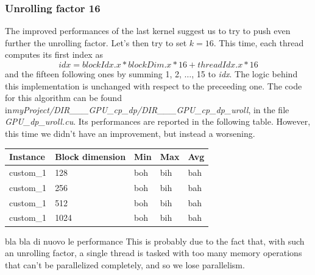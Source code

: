 \documentclass[12pt]{extarticle}
\begin{document}
\subsubsection{Unrolling factor 16}
The improved performances of the last kernel suggest us to try to push even further the unrolling factor. Let's then try to set $k=16$. This time, each thread computes its first index as
\[idx = blockIdx.x * blockDim.x * 16 + threadIdx.x * 16 \]
and the fifteen following ones by summing 1, 2, $\dots$, 15 to \emph{idx}. The logic behind this implementation is unchanged with respect to the preceeding one.\newline
The code for this algorithm can be found in\newline \emph{myProject/DIR\_\_\_GPU\_cp\_dp/DIR\_\_\_GPU\_cp\_dp\_uroll}, in the file \emph{GPU\_dp\_uroll.cu}.\newline
Its performances are reported in the following table. However, this time we didn't have an improvement, but instead a worsening.
\begin{center}
\begin{tabular}{ | m{2.2cm} | m{3.2cm} | m{2.2cm} | m{2.2cm} | m{2.2cm} |}
 \hline
 Instance & Block dimension & Min & Max & Avg\\
 \hline
 custom\_1 & 128 & boh & bih & bah\\
 \hline
 custom\_1 & 256 & boh & bih & bah\\
 \hline
 custom\_1 & 512 & boh & bih & bah\\
 \hline
 custom\_1 & 1024 & boh & bih & bah\\
 \hline
 \end{tabular}
 \end{center}
bla bla di nuovo le performance\newline
This is probably due to the fact that, with such an unrolling factor, a single thread is tasked with too many memory operations that can't be parallelized completely, and so we lose parallelism. 
\end{document}
